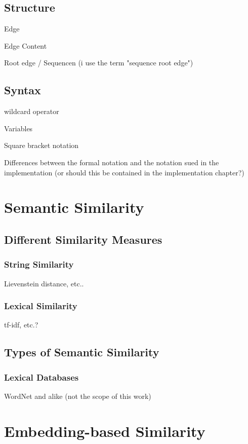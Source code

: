 \documentclass[11pt]{scrreprt}
\begin{document}
\subsection{Structure}

Edge

Edge Content

Root edge / Sequencen (i use the term "sequence root edge")

\subsection{Syntax}

wildcard operator

Variables

Square bracket notation 

Differences between the formal notation and the notation sued in the implementation
(or should this be contained in the implementation chapter?)


\section{Semantic Similarity}

\subsection{Different Similarity Measures}

\subsubsection{String Similarity}
Lievenstein distance, etc..

\subsubsection{Lexical Similarity}
tf-idf, etc.?

\subsection{Types of Semantic Similarity}

\subsubsection{Lexical Databases}
WordNet and alike (not the scope of this work)


\section{Embedding-based Similarity}
\end{document}

